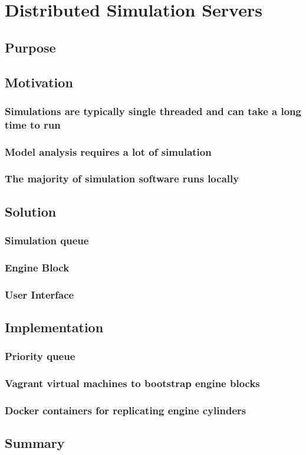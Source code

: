 \chapter{Distributed Simulation Servers}

\section{Purpose}


\section{Motivation}
\subsection{Simulations are typically single threaded and can take a long time to run}
\subsection{Model analysis requires a lot of simulation}
\subsection{The majority of simulation software runs locally}


\section{Solution}
\subsection{Simulation queue}
\subsection{Engine Block}
\subsection{User Interface}


\section{Implementation}
\subsection{Priority queue}
\subsection{Vagrant virtual machines to bootstrap engine blocks}
\subsection{Docker containers for replicating engine cylinders}


\section{Summary}
